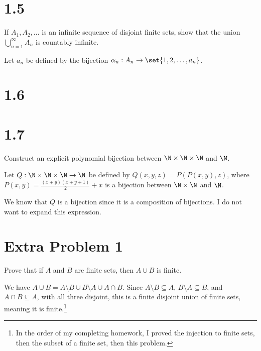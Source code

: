\documentclass[10pt]{mypackage}
\begin{document}
\section{1.5}%
\begin{problem}
  If $A_1,A_2,\dots$ is an infinite sequence of disjoint finite sets, show that the union $\bigcup_{n=1}^{\infty}A_n$ is countably infinite.
\end{problem}
\begin{solution}
  Let $a_n$ be defined by the bijection $\alpha_n: A_n \rightarrow \set{1,2,\dots,a_n}$.
\end{solution}
\section{1.6}%
\section{1.7}%
\begin{problem}
  Construct an explicit polynomial bijection between $\N\times\N\times\N$ and $\N$.
\end{problem}
\begin{solution}
  Let $Q: \N\times\N\times\N \rightarrow \N$ be defined by $Q(x,y,z) = P\left(P(x,y),z\right)$, where $P(x,y) = \frac{(x+y)(x+y+1)}{2} + x$ is a bijection between $\N\times\N$ and $\N$.\newline

  We know that $Q$ is a bijection since it is a composition of bijections. I do not want to expand this expression.
\end{solution}
\section{Extra Problem 1}%
\begin{problem}
  Prove that if $A$ and $B$ are finite sets, then $A\cup B$ is finite.
\end{problem}
\begin{solution}
  We have $A\cup B = A\setminus B \cup B\setminus A \cup A\cap B$. Since $A\setminus B\subseteq A$, $B\setminus A\subseteq B$, and $A\cap B\subseteq A$, with all three disjoint, this is a finite disjoint union of finite sets, meaning it is finite.\footnote{In the order of my completing homework, I proved the injection to finite sets, then the subset of a finite set, then this problem.}
\end{solution}
\end{document}
